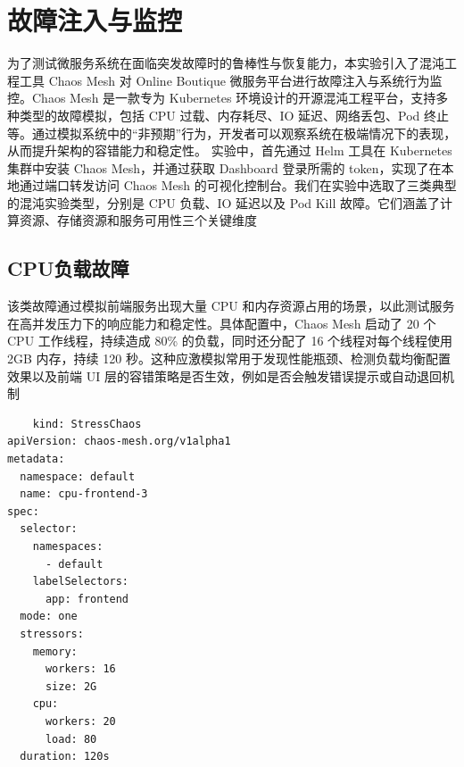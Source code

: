 \documentclass[hyperref,a4paper,UTF8]{ctexart}
\begin{document}
\section{故障注入与监控}
为了测试微服务系统在面临突发故障时的鲁棒性与恢复能力，本实验引入了混沌工程工具 Chaos Mesh 对 Online Boutique 微服务平台进行故障注入与系统行为监控。Chaos Mesh 是一款专为 Kubernetes 环境设计的开源混沌工程平台，支持多种类型的故障模拟，包括 CPU 过载、内存耗尽、IO 延迟、网络丢包、Pod 终止等。通过模拟系统中的“非预期”行为，开发者可以观察系统在极端情况下的表现，从而提升架构的容错能力和稳定性。
实验中，首先通过 Helm 工具在 Kubernetes 集群中安装 Chaos Mesh，并通过获取 Dashboard 登录所需的 token，实现了在本地通过端口转发访问 Chaos Mesh 的可视化控制台。我们在实验中选取了三类典型的混沌实验类型，分别是 CPU 负载、IO 延迟以及 Pod Kill 故障。它们涵盖了计算资源、存储资源和服务可用性三个关键维度

\subsection{CPU负载故障}
该类故障通过模拟前端服务出现大量 CPU 和内存资源占用的场景，以此测试服务在高并发压力下的响应能力和稳定性。具体配置中，Chaos Mesh 启动了 20 个 CPU 工作线程，持续造成 80\% 的负载，同时还分配了 16 个线程对每个线程使用 2GB 内存，持续 120 秒。这种应激模拟常用于发现性能瓶颈、检测负载均衡配置效果以及前端 UI 层的容错策略是否生效，例如是否会触发错误提示或自动退回机制
\begin{lstlisting}
    kind: StressChaos
apiVersion: chaos-mesh.org/v1alpha1
metadata:
  namespace: default
  name: cpu-frontend-3
spec:
  selector:
    namespaces:
      - default
    labelSelectors:
      app: frontend
  mode: one
  stressors:
    memory:
      workers: 16
      size: 2G
    cpu:
      workers: 20
      load: 80
  duration: 120s
\end{lstlisting}
\end{document}
